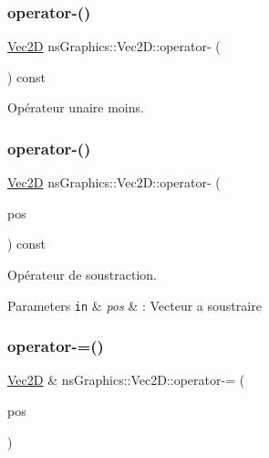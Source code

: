 \subsubsection{\texorpdfstring{operator-\/()}{operator-()}\hspace{0.1cm}{\footnotesize\ttfamily [1/2]}}
{\footnotesize\ttfamily \hyperlink{classns_graphics_1_1_vec2_d}{Vec2D} ns\+Graphics\+::\+Vec2\+D\+::operator-\/ (\begin{DoxyParamCaption}{ }\end{DoxyParamCaption}) const}



Opérateur unaire moins. 

\mbox{\label{classns_graphics_1_1_vec2_d_a6431bcd5dd86fbaf119bed9cf01a13f2}} 
\subsubsection{\texorpdfstring{operator-\/()}{operator-()}\hspace{0.1cm}{\footnotesize\ttfamily [2/2]}}
{\footnotesize\ttfamily \hyperlink{classns_graphics_1_1_vec2_d}{Vec2D} ns\+Graphics\+::\+Vec2\+D\+::operator-\/ (\begin{DoxyParamCaption}\item[{const \hyperlink{classns_graphics_1_1_vec2_d}{Vec2D} \&}]{pos }\end{DoxyParamCaption}) const}



Opérateur de soustraction. 


\begin{DoxyParams}[1]{Parameters}
\mbox{\tt in}  & {\em pos} & \+: Vecteur a soustraire \\
\hline
\end{DoxyParams}
\mbox{\label{classns_graphics_1_1_vec2_d_aa9b0986206c35bb5c0043db02548fce4}} 
\subsubsection{\texorpdfstring{operator-\/=()}{operator-=()}}
{\footnotesize\ttfamily \hyperlink{classns_graphics_1_1_vec2_d}{Vec2D} \& ns\+Graphics\+::\+Vec2\+D\+::operator-\/= (\begin{DoxyParamCaption}\item[{const \hyperlink{classns_graphics_1_1_vec2_d}{Vec2D} \&}]{pos }\end{DoxyParamCaption})}



